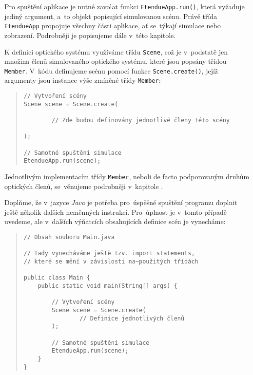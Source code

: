 Pro spuštění aplikace je nutné zavolat funkci \texttt{EtendueApp.run()}, která vyžaduje jediný argument, a~to objekt popisující simulovanou scénu. Právě třída \texttt{EtendueApp} propojuje všechny části aplikace, ať se~týkají simulace nebo zobrazení. Podrobněji je popisujeme dále v~této kapitole.

K definici optického systému využíváme třídu \texttt{Scene}, což je v~podstatě jen množina členů simulovaného optického systému, které jsou popsány třídou \texttt{Member}. V~kódu definujeme scénu pomocí funkce \texttt{Scene.create()}, jejíž argumenty jsou instance výše zmíněné třídy \texttt{Member}:

\begin{minipage}{\textwidth}\begin{quote}\begin{lstlisting}
// Vytvoření scény
Scene scene = Scene.create(

        // Zde budou definovány jednotlivé členy této scény

);

// Samotné spuštění simulace
EtendueApp.run(scene);
\end{lstlisting}\end{quote}\end{minipage}

Jednotlivým implementacím třídy \texttt{Member}, neboli de facto podporovaným druhům optických členů, se~věnujeme podrobněji v~kapitole .

Doplňme, že v~jazyce \emph{Java} je potřeba pro~úspěšné spuštění programu doplnit ještě několik dalších neměnných instrukcí. Pro~úplnost je v~tomto případě uvedeme, ale v~dalších výňatcích obsahujících definice scén je vynecháme:

\begin{minipage}{\textwidth}\begin{quote}\begin{lstlisting}
// Obsah souboru Main.java

// Tady vynecháváme ještě tzv. import statements,
// které se mění v závislosti na~použitých třídách

public class Main {
    public static void main(String[] args) {

        // Vytvoření scény
        Scene scene = Scene.create(
                // Definice jednotlivých členů
        );

        // Samotné spuštění simulace
        EtendueApp.run(scene);
    }
}
\end{lstlisting}\end{quote}\end{minipage}

